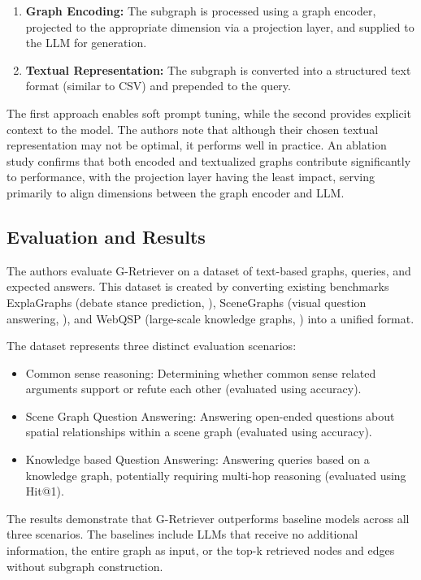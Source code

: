 \begin{enumerate}
    \item \textbf{Graph Encoding:} The subgraph is processed using a graph encoder, projected to the appropriate dimension via a projection layer, and supplied to the LLM for generation.
    \item \textbf{Textual Representation:} The subgraph is converted into a structured text format (similar to CSV) and prepended to the query.
\end{enumerate}

The first approach enables soft prompt tuning, while the second provides explicit context to the model.
The authors note that although their chosen textual representation may not be optimal, it performs well in practice.
An ablation study confirms that both encoded and textualized graphs contribute significantly to performance, with the projection layer having the least impact, serving primarily to align dimensions between the graph encoder and LLM.

\subsection{Evaluation and Results}

The authors evaluate G-Retriever on a dataset of text-based graphs, queries, and expected answers.
This dataset is created by converting existing benchmarks \textemdash{} ExplaGraphs (debate stance prediction, \cite{explagraphs}), SceneGraphs (visual question answering, \cite{scenegraphs}), and WebQSP (large-scale knowledge graphs, \cite{webqsp}) \textemdash{} into a unified format.

The dataset represents three distinct evaluation scenarios:

\begin{itemize}

    \item Common sense reasoning: Determining whether common sense related arguments support or refute each other (evaluated using accuracy).
    \item Scene Graph Question Answering: Answering open-ended questions about spatial relationships within a scene graph (evaluated using accuracy).
    \item Knowledge based Question Answering: Answering queries based on a knowledge graph, potentially requiring multi-hop reasoning (evaluated using Hit@1).
\end{itemize}

The results demonstrate that G-Retriever outperforms baseline models across all three scenarios. The baselines include LLMs that receive no additional information, the entire graph as input, or the top-k retrieved nodes and edges without subgraph construction.

